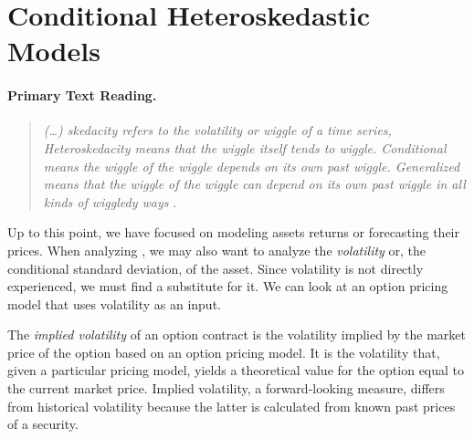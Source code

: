 \section{Conditional Heteroskedastic Models}\label{Conditional Heteroskedastic}
\paragraph{Primary Text Reading.} 

\begin{quotation}
\emph{(\ldots) skedacity refers to the volatility or wiggle of a time series, Heteroskedacity means that the wiggle itself tends to wiggle. Conditional means the wiggle of the wiggle depends on its own past wiggle. Generalized means that the wiggle of the wiggle can depend on its own past wiggle in all kinds of wiggledy ways} \cite[Kent Osband quoted in page 1]{ardia2008frm}.
\end{quotation}

Up to this point, we have focused on modeling assets returns or forecasting their prices. When analyzing \fts{}, we may also want to analyze the \emph{volatility} or, the conditional standard deviation, of the asset. Since volatility is not directly experienced, we must find a substitute for it. We can look at an option pricing model that uses volatility as an input.

The \emph{implied volatility} of an option contract is the volatility implied by the market price of the option based on an option pricing model. It is the volatility that, given a particular pricing model, yields a theoretical value for the option equal to the current market price. Implied volatility, a forward-looking measure, differs from historical volatility because the latter is calculated from known past prices of a security.

